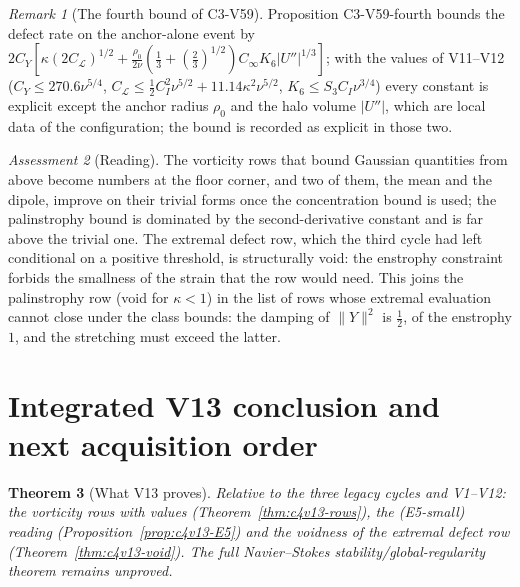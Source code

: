 \documentclass[11pt]{article}
\theoremstyle{plain}
\newtheorem{theorem}{Theorem}[section]
\theoremstyle{definition}
\theoremstyle{remark}
\newtheorem{remark}[theorem]{Remark}
\newtheorem{assessment}[theorem]{Assessment}
\begin{document}
\begin{remark}[The fourth bound of C3-V59]
\label{rem:c4v13-fourth}
Proposition C3-V59-fourth bounds the defect rate on the anchor-alone
event by \(2C_Y[\kappa(2C_{\mathcal L})^{1/2}+\frac{\rho_0}{2\nu}(\frac13+(\frac23)^{1/2})C_\infty K_6|U''|^{1/3}]\); with the values
of V11--V12 (\(C_Y\le270.6\nu^{5/4}\), \(C_{\mathcal L}\le\frac12C_I^2\nu^{5/2}+11.14\kappa^2\nu^{5/2}\), \(K_6\le S_3C_I\nu^{3/4}\)) every
constant is explicit except the anchor radius \(\rho_0\) and the halo
volume \(|U''|\), which are local data of the configuration; the bound
is recorded as explicit in those two.
\end{remark}

\begin{assessment}[Reading]
\label{ass:c4v13-reading}
The vorticity rows that bound Gaussian quantities from above become
numbers at the floor corner, and two of them, the mean and the
dipole, improve on their trivial forms once the concentration bound
is used; the palinstrophy bound is dominated by the second-derivative
constant and is far above the trivial one.  The extremal defect row,
which the third cycle had left conditional on a positive threshold,
is structurally void: the enstrophy constraint forbids the smallness
of the strain that the row would need.  This joins the palinstrophy
row (void for \(\kappa<1\)) in the list of rows whose extremal evaluation
cannot close under the class bounds: the damping of \(\|Y\|^2\) is \(\frac12\), of
the enstrophy \(1\), and the stretching must exceed the latter.
\end{assessment}

\section{Integrated V13 conclusion and next acquisition order}
\label{sec:c4v13-conclusion}

\begin{theorem}[What V13 proves]
\label{thm:c4v13-conclusion}
Relative to the three legacy cycles and V1--V12: the vorticity rows
with values (Theorem~\ref{thm:c4v13-rows}), the (E5-small) reading
(Proposition~\ref{prop:c4v13-E5}) and the voidness of the extremal defect
row (Theorem~\ref{thm:c4v13-void}).  The full Navier--Stokes
stability/global-regularity theorem remains unproved.
\end{theorem}
\end{document}
